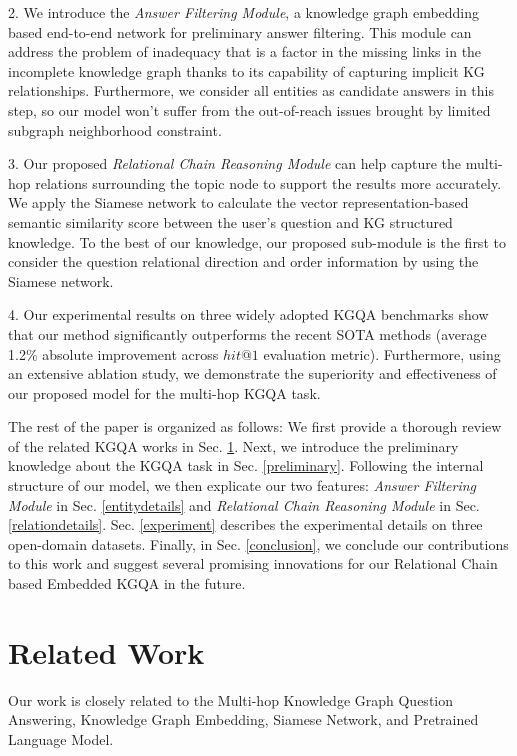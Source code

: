 \documentclass[pdflatex,sn-mathphys]{sn-jnl}%
\theoremstyle{thmstyleone}%
\theoremstyle{thmstyletwo}%
\theoremstyle{thmstylethree}%
\begin{document}
2. We introduce the \textit{Answer Filtering Module}, a knowledge graph embedding based end-to-end network for preliminary answer filtering. This module can address the problem of inadequacy that is a factor in the missing links in the incomplete knowledge graph thanks to its capability of capturing implicit KG relationships. Furthermore, we consider all entities as candidate answers in this step, so our model won't suffer from the out-of-reach issues brought by limited subgraph neighborhood constraint.

3. Our proposed \textit{Relational Chain Reasoning Module} can help capture the multi-hop relations surrounding the topic node to support the results more accurately. We apply the Siamese network \cite{sia2016jonas} to calculate the vector representation-based semantic similarity score between the user's question and KG structured knowledge. To the best of our knowledge, our proposed sub-module is the first to consider the question relational direction and order information by using the Siamese network.

4. Our experimental results on three widely adopted KGQA benchmarks show that our method significantly outperforms the recent SOTA methods (average 1.2\% absolute improvement across $hit@1$ evaluation metric). Furthermore, using an extensive ablation study, we demonstrate the superiority and effectiveness of our proposed model for the multi-hop KGQA task.

The rest of the paper is organized as follows: We first provide a thorough review of the related KGQA works in Sec. \ref{relatedwork}. Next, we introduce the preliminary knowledge about the KGQA task in Sec. \ref{preliminary}. Following the internal structure of our model, we then explicate our two features: \textit{Answer Filtering Module} in Sec. \ref{entitydetails} and \textit{Relational Chain Reasoning Module} in Sec. \ref{relationdetails}. Sec. \ref{experiment} describes the experimental details on three open-domain datasets. Finally, in Sec. \ref{conclusion}, we conclude our contributions to this work and suggest several promising innovations for our Relational Chain based Embedded KGQA in the future.

\section{Related Work}\label{relatedwork}

Our work is closely related to the Multi-hop Knowledge Graph Question Answering, Knowledge Graph  Embedding, Siamese Network, and Pretrained Language Model.
\end{document}
